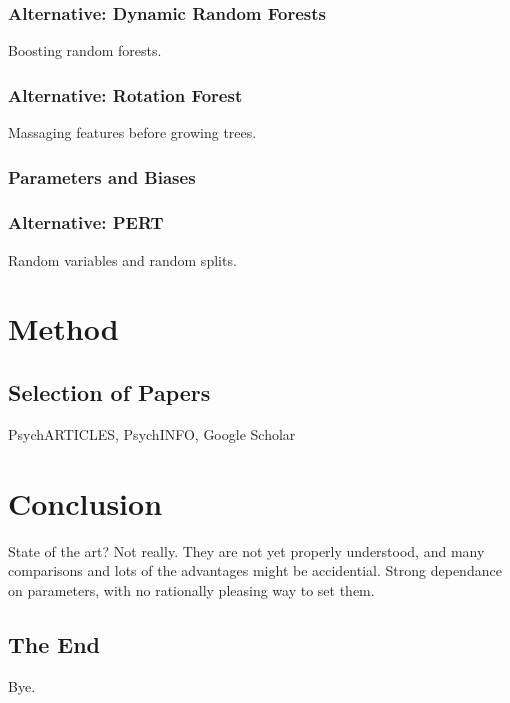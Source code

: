 \documentclass[a4paper,man,12pt,apacite]{apa6} %
\begin{document}
\subsubsection{Alternative: Dynamic Random Forests}
Boosting random forests.

\subsubsection{Alternative: Rotation Forest}
Massaging features before growing trees.

\subsubsection{Parameters and Biases}

\subsubsection{Alternative: PERT}
Random variables and random splits.

\section{Method}

\subsection{Selection of Papers}
PsychARTICLES, PsychINFO, Google Scholar

\section{Conclusion}
State of the art? Not really. They are not yet properly understood, and
many comparisons and lots of the advantages might be accidential.
Strong dependance on parameters, with no rationally pleasing way to set them.

\subsection{The End}
Bye.


\end{document}
